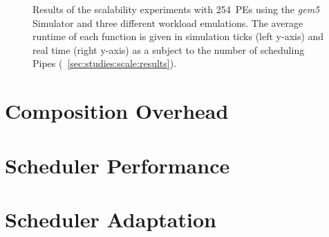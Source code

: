 \begin{figure} \centering
	\caption[Results of the scalability experiments with 254~PEs.]{Results of the scalability experiments with 254~\acp{PE} using the \emph{gem5} Simulator and three different workload emulations. The average runtime of each function is given in simulation ticks (left y-axis) and real time (right y-axis) as a subject to the number of scheduling Pipes (\cf~\cref{sec:studies:scale:results}).}%
	\label{fig:eval:scale-gem5-254c}
\end{figure}





















\clearpage
\section{Composition Overhead}



\clearpage
\section{Scheduler Performance}

\vspace{-6mm}

\vspace{-3mm}


\clearpage
\section{Scheduler Adaptation}



